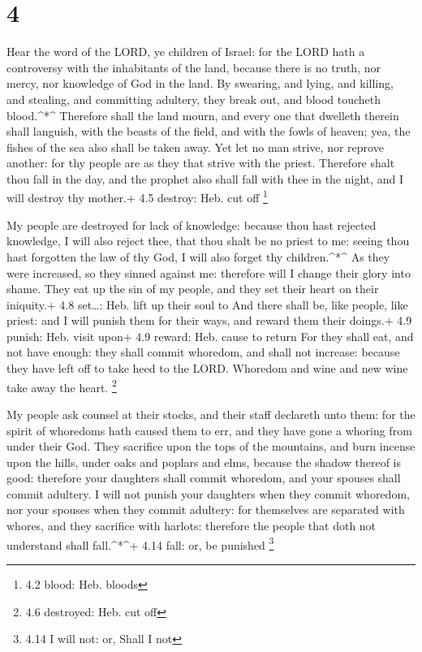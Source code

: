 \hypertarget{section-3}{%
\section{4}\label{section-3}}

 Hear the word of the LORD, ye children of Israel: for the
LORD hath a controversy with the inhabitants of the land, because there
is no truth, nor mercy, nor knowledge of God in the land. 
By swearing, and lying, and killing, and stealing, and committing
adultery, they break out, and blood toucheth blood.\^{}*\^{}
 Therefore shall the land mourn, and every one that dwelleth
therein shall languish, with the beasts of the field, and with the fowls
of heaven; yea, the fishes of the sea also shall be taken away.
 Yet let no man strive, nor reprove another: for thy people
are as they that strive with the priest.  Therefore shalt
thou fall in the day, and the prophet also shall fall with thee in the
night, and I will destroy thy mother.+ 4.5 destroy: Heb. cut off
\footnote{4.2 blood: Heb. bloods}

 My people are destroyed for lack of knowledge: because thou
hast rejected knowledge, I will also reject thee, that thou shalt be no
priest to me: seeing thou hast forgotten the law of thy God, I will also
forget thy children.\^{}*\^{}  As they were increased, so
they sinned against me: therefore will I change their glory into shame.
 They eat up the sin of my people, and they set their heart
on their iniquity.+ 4.8 set\ldots: Heb. lift up their soul to
 And there shall be, like people, like priest: and I will
punish them for their ways, and reward them their doings.+ 4.9 punish:
Heb. visit upon+ 4.9 reward: Heb. cause to return  For they
shall eat, and not have enough: they shall commit whoredom, and shall
not increase: because they have left off to take heed to the LORD.
 Whoredom and wine and new wine take away the heart.
\footnote{4.6 destroyed: Heb. cut off}

 My people ask counsel at their stocks, and their staff
declareth unto them: for the spirit of whoredoms hath caused them to
err, and they have gone a whoring from under their God. 
They sacrifice upon the tops of the mountains, and burn incense upon the
hills, under oaks and poplars and elms, because the shadow thereof is
good: therefore your daughters shall commit whoredom, and your spouses
shall commit adultery.  I will not punish your daughters
when they commit whoredom, nor your spouses when they commit adultery:
for themselves are separated with whores, and they sacrifice with
harlots: therefore the people that doth not understand shall
fall.\^{}*\^{}+ 4.14 fall: or, be punished \footnote{4.14 I will not:
  or, Shall I not}

